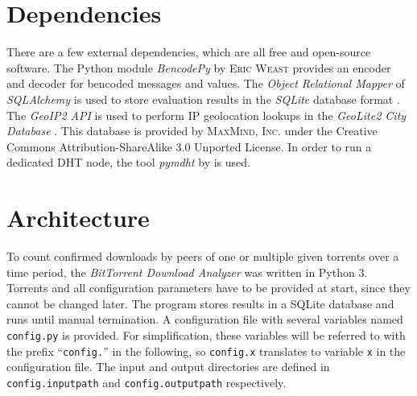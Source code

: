\documentclass[10pt, a4paper, twoside, headsepline]{scrbook}
\renewcommand{\_}{\origunderscore\allowbreak}
\newcommand{\config}[1]{\texttt{config.\allowbreak #1}}
\begin{document}
\section{Dependencies}
\label{dep}
There are a few external dependencies, which are all free and open-source software. The Python module \emph{BencodePy} by \textsc{Eric Weast} \cite{bencodepy} provides an encoder and decoder for bencoded messages and values. The \emph{Object Relational Mapper} of \emph{SQLAlchemy} \cite{sqlalchemy} is used to store evaluation results in the \emph{SQLite} database format \cite{sqlite}. The \emph{GeoIP2 API} \cite{geoip2-api} is used to perform IP geolocation lookups in the \emph{GeoLite2 City Database} \cite{geolite2-db}. This database is provided by \textsc{MaxMind, Inc.} under the Creative Commons Attribution-ShareAlike 3.0 Unported License. In order to run a dedicated DHT node, the tool \emph{pymdht} by \textcite{pymdht} is used.

\section{Architecture}
To count confirmed downloads by peers of one or multiple given torrents over a time period, the \emph{BitTorrent Download Analyzer} was written in Python 3. Torrents and all configuration parameters have to be provided at start, since they cannot be changed later. The program stores results in a SQLite database and runs until manual termination. A configuration file with several variables named \texttt{config.py} is provided. For simplification, these variables will be referred to with the prefix ``\texttt{config.}'' in the following, so \config{x} translates to variable \texttt{x} in the configuration file. The input and output directories are defined in \config{input\_path} and \config{output\_path} respectively.
\end{document}
